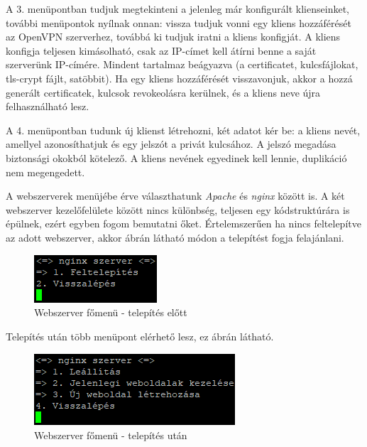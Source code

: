 A 3. menüpontban tudjuk megtekinteni a jelenleg már konfigurált klienseinket, további menüpontok nyílnak onnan: vissza tudjuk vonni egy kliens hozzáférését az OpenVPN szerverhez, továbbá ki tudjuk iratni a kliens konfigját. A kliens konfigja teljesen kimásolható, csak az IP-címet kell átírni benne a saját szerverünk IP-címére. Mindent tartalmaz beágyazva (a certificatet, kulcsfájlokat, tls-crypt fájlt, satöbbit).
Ha egy kliens hozzáférését visszavonjuk, akkor a hozzá generált certificatek, kulcsok revokeolásra kerülnek, és a kliens neve újra felhasználható lesz.

A 4. menüpontban tudunk új klienst létrehozni, két adatot kér be: a kliens nevét, amellyel azonosíthatjuk és egy jelszót a privát kulcsához. A jelszó megadása biztonsági okokból kötelező. A kliens nevének egyedinek kell lennie, duplikáció nem megengedett.

\pagebreak

A webszerverek menüjébe érve választhatunk \textit{Apache} és \textit{nginx} között is. A két webszerver kezelőfelülete között nincs különbség, teljesen egy kódstruktúrára is épülnek, ezért egyben fogom bemutatni őket. Értelemszerűen ha nincs feltelepítve az adott webszerver, akkor  ábrán látható módon a telepítést fogja felajánlani.

\begin{figure}[h]
\centering
\includegraphics[scale=1]{images/web_before_install.png}
\caption{Webszerver főmenü - telepítés előtt}
\label{fig:web_before_install}
\end{figure}

Telepítés után több menüpont elérhető lesz, ez  ábrán látható.

\begin{figure}[h]
\centering
\includegraphics[scale=1]{images/web_after_install.png}
\caption{Webszerver főmenü - telepítés után}
\label{fig:web_after_install}
\end{figure}

